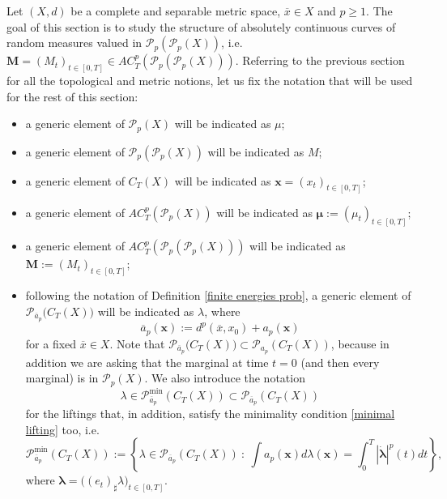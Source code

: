 \documentclass[10pt,leqno]{amsart}
\numberwithin{equation}{section}
\newcommand{\PP}{\mathcal{P}}
\begin{document}
Let $(X,d)$ be a complete and separable metric space, $\overline{x} \in X$ and $p\geq 1$. The goal of this section is to study the structure of absolutely continuous curves of random measures valued in $\PP_p(\PP_p(X))$, i.e. $\boldsymbol{M} = (M_t)_{t\in[0,T]} \in AC_T^p(\PP_p(\PP_p(X)))$. Referring to the previous section for all the topological and metric notions, let us fix the notation that will be used for the rest of this section:
\begin{itemize}
    \item a generic element of $\PP_p(X)$ will be indicated as $\mu$;
    \item a generic element of $\PP_p(\PP_p(X))$ will be indicated as $M$;
    \item a generic element of $C_T(X)$ will be indicated as $\boldsymbol{x}=(x_t)_{t\in [0,T]}$;
    \item a generic element of $AC_T^p(\PP_p(X))$ will be indicated as $\boldsymbol{\mu}:=(\mu_t)_{t\in[0,T]}$; 
    \item a generic element of $AC_T^p(\PP_p(\PP_p(X)))$ will be indicated as $\boldsymbol{M}:=(M_t)_{t\in[0,T]}$; 
    \item following the notation of Definition \ref{finite energies prob}, a generic element of $\PP_{\overline{a}_p}\big(C_T(X)\big)$ will be indicated as $\lambda$, where
    \begin{equation}\label{eq: ac energy with initial moment}
        \overline{a}_p(\boldsymbol{x}):= d^p(\overline{x},x_0) +  a_p(\boldsymbol{x})
    \end{equation}
    for a fixed $\overline{x}\in X$.
    Note that $\PP_{\overline{a}_p}\big(C_T(X)\big) \subset \PP_{a_p}(C_T(X))$, because in addition we are asking that the marginal at time $t=0$ (and then every marginal) is in $\PP_p(X)$. We also introduce the notation 
    \begin{equation}\label{minimal optimal lifting}
        \lambda \in \PP_{\overline{a}_p}^{\operatorname{min}}(C_T(X)) \subset \PP_{\overline{a}_p}(C_T(X))
    \end{equation}
    for the liftings that, in addition, satisfy the minimality condition \eqref{minimal lifting} too, i.e. 
    \[\PP_{\overline{a}_p}^{\operatorname{min}}(C_T(X)):= \left\{\lambda 
    \in \PP_{\overline{a}_p}(C_T(X)) \ : \ \int a_p(\boldsymbol{x}) d\lambda(\boldsymbol{x}) = \int_0^T|\dot{\boldsymbol{\lambda}}|^p(t) dt\right\},\]
    where $\boldsymbol{\lambda} = \big( (e_t)_\sharp \lambda\big)_{t\in[0,T]}$.
\end{itemize}
\end{document}
